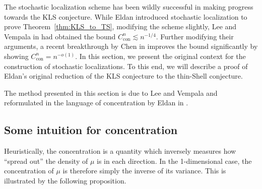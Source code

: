 The stochastic localization scheme has been wildly successful in making progress towards the KLS conjecture. 
While Eldan introduced stochastic localization to prove Theorem~\ref{thm:KLS_to_TS}, 
modifying the scheme slightly, Lee and Vempala in \cite{Lee_2016} had obtained the bound 
\(C_{\text{con}}^n \lesssim n^{-1 / 4}\). Further modifying their arguments, a recent breakthrough by 
Chen in \cite{Chen_2020} improves the bound significantly by showing \(C_{\text{con}}^n = n^{-o(1)}\).
In this section, we present the original context for the construction of stochastic 
localizations. To this end, we will describe a proof of Eldan's original reduction of the KLS 
conjecture to the thin-Shell conjecture.

The method presented in this section is due to Lee and Vempala \cite{Lee_2016} and reformulated in 
the language of concentration by Eldan in \cite{Eldan_notes}.


\subsection{Some intuition for concentration}



Heuristically, the concentration is a quantity which inversely measures how ``spread out'' the density 
of \(\mu\) is in each direction. In the 1-dimensional case, the concentration of \(\mu\) is therefore 
simply the inverse of its variance. This is illustrated by the following proposition. 

